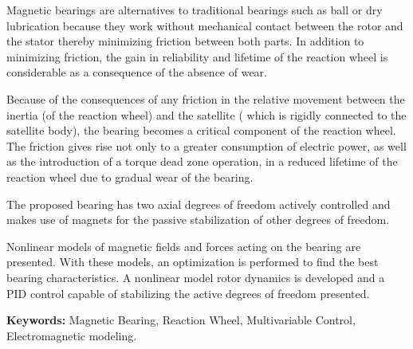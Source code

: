 Magnetic bearings are alternatives to traditional bearings such as ball or dry lubrication because they work without mechanical contact between the rotor and the stator thereby minimizing friction between both parts. In addition to minimizing friction, the gain in reliability and lifetime of the reaction wheel is considerable as a consequence of the absence of wear.

Because of the consequences of any friction in the relative movement between the inertia (of the reaction wheel) and the satellite ( which is rigidly connected to the satellite body), the bearing becomes a critical component of the reaction wheel. The friction gives rise not only to a greater consumption of electric power, as well as the introduction of a torque dead zone operation,  in a reduced lifetime of the reaction wheel due to gradual wear of the bearing.

The proposed bearing has two axial degrees of freedom actively controlled and makes use of magnets for the passive stabilization of other degrees of freedom.

Nonlinear models of magnetic fields and forces acting on the bearing are presented. With these models, an optimization is performed to find the best bearing characteristics. A nonlinear model rotor dynamics is developed and a PID control capable of stabilizing the active degrees of freedom presented.


\par
\vspace{1em}
\noindent\textbf{Keywords:} Magnetic Bearing, Reaction Wheel, Multivariable Control, Electromagnetic modeling.

\normalsize 


\newpage


\listoffigures

\listoftables


\tableofcontents

